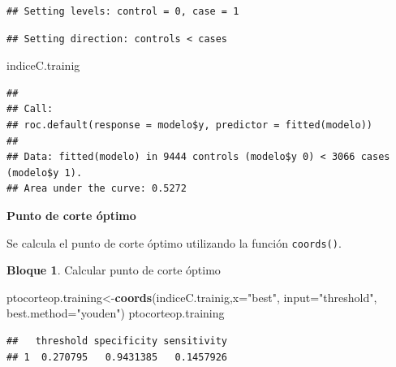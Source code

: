 \documentclass[]{book}
\newenvironment{Shaded}{\begin{snugshade}}{\end{snugshade}}
\newcommand{\CommentTok}[1]{\textcolor[rgb]{0.56,0.35,0.01}{\textit{#1}}}
\newcommand{\DataTypeTok}[1]{\textcolor[rgb]{0.13,0.29,0.53}{#1}}
\newcommand{\KeywordTok}[1]{\textcolor[rgb]{0.13,0.29,0.53}{\textbf{#1}}}
\newcommand{\NormalTok}[1]{#1}
\newcommand{\OperatorTok}[1]{\textcolor[rgb]{0.81,0.36,0.00}{\textbf{#1}}}
\newcommand{\StringTok}[1]{\textcolor[rgb]{0.31,0.60,0.02}{#1}}
\theoremstyle{definition}
\theoremstyle{definition}
\newtheorem{example}{Bloque}[chapter]
\theoremstyle{definition}
\theoremstyle{definition}
\theoremstyle{remark}
\begin{document}
\begin{Shaded}
\end{Shaded}

\begin{verbatim}
## Setting levels: control = 0, case = 1
\end{verbatim}

\begin{verbatim}
## Setting direction: controls < cases
\end{verbatim}

\begin{Shaded}
\begin{Highlighting}[]
\NormalTok{indiceC.trainig}
\end{Highlighting}
\end{Shaded}

\begin{verbatim}
## 
## Call:
## roc.default(response = modelo$y, predictor = fitted(modelo))
## 
## Data: fitted(modelo) in 9444 controls (modelo$y 0) < 3066 cases (modelo$y 1).
## Area under the curve: 0.5272
\end{verbatim}

\textbf{Punto de corte óptimo}

Se calcula el punto de corte óptimo utilizando la función \texttt{coords()}.

\begin{example}
\protect\hypertarget{exm:bloque18nbm}{}{\label{exm:bloque18nbm} }Calcular punto de corte óptimo
\end{example}

\begin{Shaded}
\begin{Highlighting}[]
\NormalTok{ptocorteop.training<-}\KeywordTok{coords}\NormalTok{(indiceC.trainig,}\DataTypeTok{x=}\StringTok{"best"}\NormalTok{,}
                            \DataTypeTok{input=}\StringTok{"threshold"}\NormalTok{,}
                            \DataTypeTok{best.method=}\StringTok{"youden"}\NormalTok{)}
\NormalTok{ptocorteop.training}
\end{Highlighting}
\end{Shaded}

\begin{verbatim}
##   threshold specificity sensitivity
## 1  0.270795   0.9431385   0.1457926
\end{verbatim}
\end{document}
